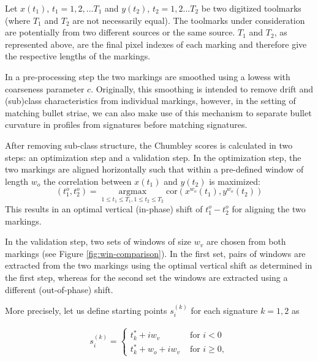 \documentclass[12pt]{article}
\begin{document}
Let \(x(t_1)\), \(t_1 = 1,2,...T_1\) and \(y(t_2)\), \(t_2 = 1,2...T_2\)
be two digitized toolmarks (where \(T_1\) and \(T_2\) are not
necessarily equal). The toolmarks under consideration are potentially
from two different sources or the same source. \(T_1\) and \(T_2\), as
represented above, are the final pixel indexes of each marking and
therefore give the respective lengths of the markings.

In a pre-processing step the two markings are smoothed using a lowess
\citep{lowess} with coarseness parameter \(c\). Originally, this
smoothing is intended to remove drift and (sub)class characteristics
from individual markings, however, in the setting of matching bullet
striae, we can also make use of this mechanism to separate bullet
curvature in profiles from signatures before matching signatures.

After removing sub-class structure, the Chumbley scores is calculated in
two steps: an optimization step and a validation step. In the
optimization step, the two markings are aligned horizontally such that
within a pre-defined window of length \(w_o\) the correlation between
\(x(t_1)\) and \(y(t_2)\) is maximized: \[
\left(t_1^o, t_2^o\right) = \mathop{\arg \max}\limits_{1 \le t_1 \le T_1, 1 \le t_2 \le T_2} \text{cor} \left(x^{w_o} (t_1), y^{w_o}(t_2) \right)
\] This results in an optimal vertical (in-phase) shift of
\(t_1^o - t_2^o\) for aligning the two markings.

In the validation step, two sets of windows of size \(w_v\) are chosen
from both markings (see Figure \ref{fig:win-comparison}). In the first
set, pairs of windows are extracted from the two markings using the
optimal vertical shift as determined in the first step, whereas for the
second set the windows are extracted using a different (out-of-phase)
shift.

More precisely, let us define starting points \(s_i^{(k)}\) for each
signature \(k = 1, 2\) as

\begin{eqnarray*}
s^{(k)}_i = 
\begin{cases}
t_k^* + i w_v & \text{ for } i < 0 \\
t_k^* + w_ o + i w_v & \text{ for } i \ge 0,
\end{cases}
\end{eqnarray*}
\end{document}
